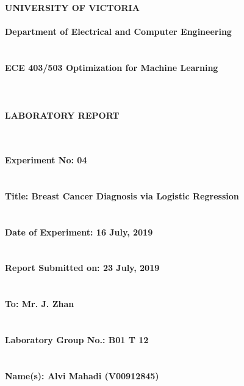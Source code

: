 \documentclass[11pt,a4paper,twoside]{article}
\begin{document}
\begin{center}
{\bf {\Huge UNIVERSITY OF VICTORIA} ~\\
	~\\
	{\huge Department of Electrical and Computer Engineering} ~\\
	~\\
	~\\
	{\huge ECE 403/503 Optimization for Machine Learning} ~\\
	~\\
	~\\
	~\\
	{\huge LABORATORY REPORT}
	~\\
	~\\
	~\\
}
\end{center}
{\bf
{\LARGE Experiment No: 04}
~\\
~\\
~\\
{\LARGE Title: Breast Cancer Diagnosis via Logistic Regression}
~\\
~\\
~\\
{\LARGE Date of Experiment: 16 July, 2019}
~\\
~\\
~\\
{\LARGE Report Submitted on: 23 July, 2019}
~\\
~\\
~\\
{\LARGE To: Mr. J. Zhan}
~\\
~\\
~\\
{\LARGE Laboratory Group No.: B01 T 12}
~\\
~\\
~\\
{\LARGE Name(s): Alvi Mahadi (V00912845)}
~\\
~\\
~\\
}

\newpage


\end{document}

